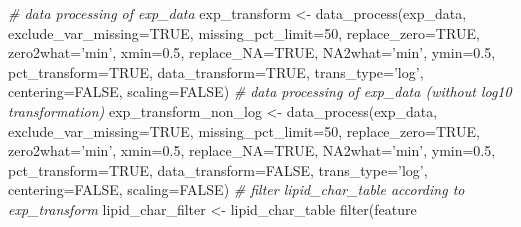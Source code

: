 \documentclass[]{article}
\newcommand{\hlnum}[1]{\textcolor[rgb]{0.816,0.125,0.439}{#1}}%
\newcommand{\hlstr}[1]{\textcolor[rgb]{0.251,0.627,0.251}{#1}}%
\newcommand{\hlcom}[1]{\textcolor[rgb]{0.502,0.502,0.502}{\textit{#1}}}%
\newcommand{\hlopt}[1]{\textcolor[rgb]{0,0,0}{#1}}%
\newcommand{\hlstd}[1]{\textcolor[rgb]{0.251,0.251,0.251}{#1}}%
\newcommand{\hlkwc}[1]{\textcolor[rgb]{0.251,0.251,0.251}{#1}}%
\newcommand{\hlkwd}[1]{\textcolor[rgb]{0.878,0.439,0.125}{#1}}%
\newenvironment{Shaded}{\begin{myshaded}}{\end{myshaded}}
\newcommand{\KeywordTok}[1]{\hlkwd{#1}}
\newcommand{\DataTypeTok}[1]{\hlkwc{#1}}
\newcommand{\DecValTok}[1]{\hlnum{#1}}
\newcommand{\FloatTok}[1]{\hlnum{#1}}
\newcommand{\StringTok}[1]{\hlstr{#1}}
\newcommand{\CommentTok}[1]{\hlcom{#1}}
\newcommand{\OtherTok}[1]{{#1}}
\newcommand{\OperatorTok}[1]{\hlopt{#1}}
\newcommand{\NormalTok}[1]{\hlstd{#1}}
\begin{document}
\begin{Shaded}
\begin{Highlighting}[]
\CommentTok{# data processing of exp_data}
\NormalTok{exp_transform <-}\StringTok{ }\KeywordTok{data_process}\NormalTok{(exp_data, }\DataTypeTok{exclude_var_missing=}\OtherTok{TRUE}\NormalTok{,}
                              \DataTypeTok{missing_pct_limit=}\DecValTok{50}\NormalTok{, }\DataTypeTok{replace_zero=}\OtherTok{TRUE}\NormalTok{,}
                              \DataTypeTok{zero2what=}\StringTok{'min'}\NormalTok{, }\DataTypeTok{xmin=}\FloatTok{0.5}\NormalTok{, }\DataTypeTok{replace_NA=}\OtherTok{TRUE}\NormalTok{,}
                              \DataTypeTok{NA2what=}\StringTok{'min'}\NormalTok{, }\DataTypeTok{ymin=}\FloatTok{0.5}\NormalTok{, }\DataTypeTok{pct_transform=}\OtherTok{TRUE}\NormalTok{,}
                              \DataTypeTok{data_transform=}\OtherTok{TRUE}\NormalTok{, }\DataTypeTok{trans_type=}\StringTok{'log'}\NormalTok{,}
                              \DataTypeTok{centering=}\OtherTok{FALSE}\NormalTok{, }\DataTypeTok{scaling=}\OtherTok{FALSE}\NormalTok{)}
\CommentTok{# data processing of exp_data (without log10 transformation)}
\NormalTok{exp_transform_non_log <-}\StringTok{ }\KeywordTok{data_process}\NormalTok{(exp_data,}
                                      \DataTypeTok{exclude_var_missing=}\OtherTok{TRUE}\NormalTok{,}
                                      \DataTypeTok{missing_pct_limit=}\DecValTok{50}\NormalTok{,}
                                      \DataTypeTok{replace_zero=}\OtherTok{TRUE}\NormalTok{, }\DataTypeTok{zero2what=}\StringTok{'min'}\NormalTok{,}
                                      \DataTypeTok{xmin=}\FloatTok{0.5}\NormalTok{, }\DataTypeTok{replace_NA=}\OtherTok{TRUE}\NormalTok{,}
                                      \DataTypeTok{NA2what=}\StringTok{'min'}\NormalTok{, }\DataTypeTok{ymin=}\FloatTok{0.5}\NormalTok{,}
                                      \DataTypeTok{pct_transform=}\OtherTok{TRUE}\NormalTok{,}
                                      \DataTypeTok{data_transform=}\OtherTok{FALSE}\NormalTok{,}
                                      \DataTypeTok{trans_type=}\StringTok{'log'}\NormalTok{,}
                                      \DataTypeTok{centering=}\OtherTok{FALSE}\NormalTok{, }\DataTypeTok{scaling=}\OtherTok{FALSE}\NormalTok{)}
\CommentTok{# filter lipid_char_table according to exp_transform}
\NormalTok{lipid_char_filter <-}\StringTok{ }\NormalTok{lipid_char_table }\OperatorTok{%
\StringTok{  }\KeywordTok{filter}\NormalTok{(feature }\OperatorTok{%
}}
\end{Highlighting}
\end{Shaded}
\end{document}
